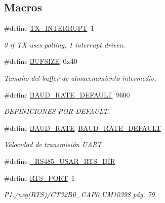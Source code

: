 \subsection*{Macros}
\begin{DoxyCompactItemize}
\item 
\#define \hyperlink{group___d_e_f_i_n_e_s_u_a_r_t_ga8557658113e8a497db405dac37ca0c71}{T\+X\+\_\+\+I\+N\+T\+E\+R\+R\+U\+PT}~1
\begin{DoxyCompactList}\small\item\em 0 if TX uses polling, 1 interrupt driven. \end{DoxyCompactList}\item 
\#define \hyperlink{group___d_e_f_i_n_e_s_u_a_r_t_gaeca034f67218340ecb2261a22c2f3dcd}{B\+U\+F\+S\+I\+ZE}~0x40
\begin{DoxyCompactList}\small\item\em Tamaño del buffer de almacenamiento intermedio. \end{DoxyCompactList}\item 
\#define \hyperlink{group___d_e_f_i_n_e_s_u_a_r_t_ga3ba6411298b98763494970e394042bed}{B\+A\+U\+D\+\_\+\+R\+A\+T\+E\+\_\+\+D\+E\+F\+A\+U\+LT}~9600
\begin{DoxyCompactList}\small\item\em D\+E\+F\+I\+N\+I\+C\+I\+O\+N\+ES P\+OR D\+E\+F\+A\+U\+LT. \end{DoxyCompactList}\item 
\#define \hyperlink{group___d_e_f_i_n_e_s_u_a_r_t_gad4455691936f92fdd6c37566fc58ba1f}{B\+A\+U\+D\+\_\+\+R\+A\+TE}~\hyperlink{group___d_e_f_i_n_e_s_u_a_r_t_ga3ba6411298b98763494970e394042bed}{B\+A\+U\+D\+\_\+\+R\+A\+T\+E\+\_\+\+D\+E\+F\+A\+U\+LT}
\begin{DoxyCompactList}\small\item\em Velocidad de transmisión U\+A\+RT. \end{DoxyCompactList}\item 
\#define \hyperlink{group___d_e_f_i_n_e_s_u_a_r_t_ga15fcd73e7add5fb7be07914dcf174eda}{\+\_\+\+R\+S485\+\_\+\+U\+S\+A\+R\+\_\+\+R\+T\+S\+\_\+\+D\+IR}
\item 
\#define \hyperlink{group___d_e_f_i_n_e_s_u_a_r_t_ga7d503384123e41cba57ad7b306df19d8}{R\+T\+S\+\_\+\+P\+O\+RT}~1
\begin{DoxyCompactList}\small\item\em P1./neg(R\+TS)/\+C\+T32\+B0\+\_\+\+C\+A\+P0 U\+M10398 pág. 79. \end{DoxyCompactList}\item 

\end{DoxyCompactItemize}
